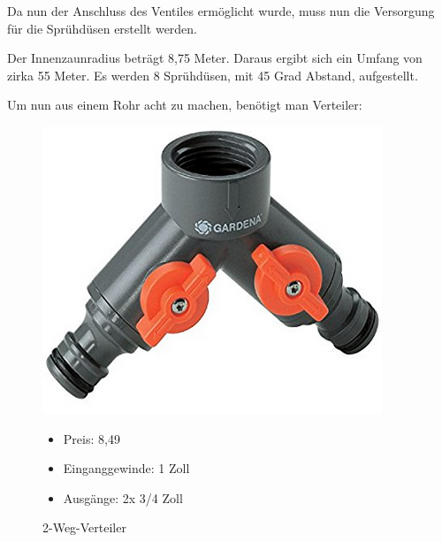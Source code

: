 Da nun der Anschluss des Ventiles ermöglicht wurde, muss nun die Versorgung für die Sprühdüsen erstellt werden. 

Der Innenzaunradius beträgt 8,75 Meter. Daraus ergibt sich ein Umfang von zirka 55 Meter. Es werden 8 Sprühdüsen, mit 45 Grad Abstand, aufgestellt. 

Um nun aus einem Rohr acht zu machen, benötigt man Verteiler:

\newpage

\begin{figure}[H]
\begin{minipage}[t]{0.45\textwidth}
\includegraphics[width=\textwidth]{fig/Gardena2Weg}
\caption{2-Weg-Verteiler}

\begin{itemize}
	\item{Preis: 8,49\textsf{\texteuro}}
	\item{Einganggewinde: 1 Zoll}
	\item{Ausgänge: 2x 3/4 Zoll}
\end{itemize}

\end{minipage}
\hspace{0.1\textwidth}
\begin{minipage}[t]{0.45\textwidth}


\end{minipage}
\end{figure}
